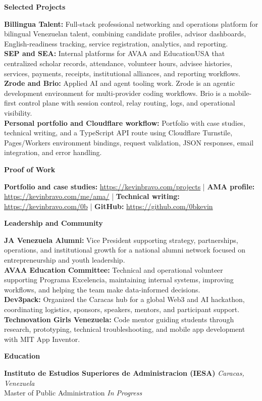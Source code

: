 \documentclass[10pt]{article}
\newcommand{\sectiontitle}[1]{%
    \vspace{5pt}
    \begin{center}
        \textbf{#1}
    \end{center}
    \vspace{-6pt}
}
\begin{document}
\sectiontitle{Selected Projects}
\textbf{Billingua Talent:} Full-stack professional networking and operations platform for bilingual Venezuelan talent, combining candidate profiles, advisor dashboards, English-readiness tracking, service registration, analytics, and reporting. \\
\textbf{SEP and SEA:} Internal platforms for AVAA and EducationUSA that centralized scholar records, attendance, volunteer hours, advisee histories, services, payments, receipts, institutional alliances, and reporting workflows. \\
\textbf{Zrode and Brio:} Applied AI and agent tooling work. Zrode is an agentic development environment for multi-provider coding workflows. Brio is a mobile-first control plane with session control, relay routing, logs, and operational visibility. \\
\textbf{Personal portfolio and Cloudflare workflow:} Portfolio with case studies, technical writing, and a TypeScript API route using Cloudflare Turnstile, Pages/Workers environment bindings, request validation, JSON responses, email integration, and error handling.

\sectiontitle{Proof of Work}
\textbf{Portfolio and case studies:} \href{https://kevinbravo.com/projects}{https://kevinbravo.com/projects}
| \textbf{AMA profile:} \href{https://kevinbravo.com/me/ama/}{https://kevinbravo.com/me/ama/}
| \textbf{Technical writing:} \href{https://kevinbravo.com/0b}{https://kevinbravo.com/0b}
| \textbf{GitHub:} \href{https://github.com/0bkevin}{https://github.com/0bkevin}

\sectiontitle{Leadership and Community}
\textbf{JA Venezuela Alumni:} Vice President supporting strategy, partnerships, operations, and institutional growth for a national alumni network focused on entrepreneurship and youth leadership. \\
\textbf{AVAA Education Committee:} Technical and operational volunteer supporting Programa Excelencia, maintaining internal systems, improving workflows, and helping the team make data-informed decisions. \\
\textbf{Dev3pack:} Organized the Caracas hub for a global Web3 and AI hackathon, coordinating logistics, sponsors, speakers, mentors, and participant support. \\
\textbf{Technovation Girls Venezuela:} Code mentor guiding students through research, prototyping, technical troubleshooting, and mobile app development with MIT App Inventor.

\sectiontitle{Education}
\textbf{Instituto de Estudios Superiores de Administracion (IESA)} \hfill \textit{Caracas, Venezuela} \\
Master of Public Administration \hfill \textit{In Progress}
\end{document}
